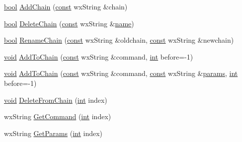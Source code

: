 \begin{DoxyCompactItemize}
\hyperlink{mac_2config_2i386_2lib-src_2libsoxr_2soxr-config_8h_abb452686968e48b67397da5f97445f5b}{bool} \hyperlink{class_batch_commands_a6b660475f8a4ebe77a450a42599ab318}{Add\+Chain} (\hyperlink{getopt1_8c_a2c212835823e3c54a8ab6d95c652660e}{const} wx\+String \&chain)
\item 
\hyperlink{mac_2config_2i386_2lib-src_2libsoxr_2soxr-config_8h_abb452686968e48b67397da5f97445f5b}{bool} \hyperlink{class_batch_commands_a40b352a2dfe1db417f45913a279c6749}{Delete\+Chain} (\hyperlink{getopt1_8c_a2c212835823e3c54a8ab6d95c652660e}{const} wx\+String \&\hyperlink{lib_2expat_8h_a1b49b495b59f9e73205b69ad1a2965b0}{name})
\item 
\hyperlink{mac_2config_2i386_2lib-src_2libsoxr_2soxr-config_8h_abb452686968e48b67397da5f97445f5b}{bool} \hyperlink{class_batch_commands_a63c1645505962c962788adbc92e2528e}{Rename\+Chain} (\hyperlink{getopt1_8c_a2c212835823e3c54a8ab6d95c652660e}{const} wx\+String \&oldchain, \hyperlink{getopt1_8c_a2c212835823e3c54a8ab6d95c652660e}{const} wx\+String \&newchain)
\item 
\hyperlink{sound_8c_ae35f5844602719cf66324f4de2a658b3}{void} \hyperlink{class_batch_commands_ae27c2f991926bcfe1d7c27152d231d4a}{Add\+To\+Chain} (\hyperlink{getopt1_8c_a2c212835823e3c54a8ab6d95c652660e}{const} wx\+String \&command, \hyperlink{xmltok_8h_a5a0d4a5641ce434f1d23533f2b2e6653}{int} before=-\/1)
\item 
\hyperlink{sound_8c_ae35f5844602719cf66324f4de2a658b3}{void} \hyperlink{class_batch_commands_ac2b2b4c1dfb2736c00e59513e41b24fd}{Add\+To\+Chain} (\hyperlink{getopt1_8c_a2c212835823e3c54a8ab6d95c652660e}{const} wx\+String \&command, \hyperlink{getopt1_8c_a2c212835823e3c54a8ab6d95c652660e}{const} wx\+String \&\hyperlink{_reverb_8cpp_aacc5617877d2aa4d17c729c1c8ba4eec}{params}, \hyperlink{xmltok_8h_a5a0d4a5641ce434f1d23533f2b2e6653}{int} before=-\/1)
\item 
\hyperlink{sound_8c_ae35f5844602719cf66324f4de2a658b3}{void} \hyperlink{class_batch_commands_afa68706c95cde15ea099493ef0b90f69}{Delete\+From\+Chain} (\hyperlink{xmltok_8h_a5a0d4a5641ce434f1d23533f2b2e6653}{int} index)
\item 
wx\+String \hyperlink{class_batch_commands_a6a46fee8fcb062db0249014e2784f58a}{Get\+Command} (\hyperlink{xmltok_8h_a5a0d4a5641ce434f1d23533f2b2e6653}{int} index)
\item 
wx\+String \hyperlink{class_batch_commands_a987f921e9bda595fe4dd4e9669f7cd62}{Get\+Params} (\hyperlink{xmltok_8h_a5a0d4a5641ce434f1d23533f2b2e6653}{int} index)
\item 

\end{DoxyCompactItemize}
